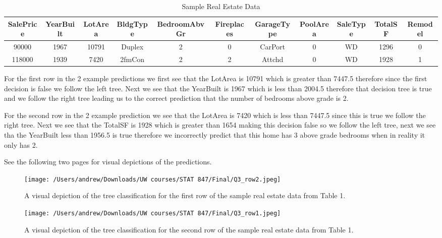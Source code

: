 \documentclass[
]{article}
\begin{document}
\begin{table}[!h]
\centering
\caption{Sample Real Estate Data}
\tiny
\begin{tabular}{|c|c|c|c|c|c|c|c|c|c|c|}
\hline
\textbf{SalePrice} & \textbf{YearBuilt} & \textbf{LotArea} & \textbf{BldgType} & \textbf{BedroomAbvGr} & \textbf{Fireplaces} & \textbf{GarageType} & \textbf{PoolArea} & \textbf{SaleType} & \textbf{TotalSF} & \textbf{Remodel} \\
\hline
90000 & 1967 & 10791 & Duplex & 2 & 0 & CarPort & 0 & WD & 1296 & 0 \\
\hline
118000 & 1939 & 7420 & 2fmCon & 2 & 2 & Attchd & 0 & WD & 1928 & 1 \\
\hline
\end{tabular}
\end{table}

For the first row in the 2 example predictions we first see that the
LotArea is 10791 which is greater than 7447.5 therefore since the first
decision is false we follow the left tree. Next we see that the
YearBuilt is 1967 which is less than 2004.5 therefore that decision tree
is true and we follow the right tree leading us to the correct
prediction that the number of bedrooms above grade is 2.

For the second row in the 2 example prediction we see that the LotArea
is 7420 which is less than 7447.5 since this is true we follow the right
tree. Next we see that the TotalSF is 1928 which is greater than 1654
making this decision false so we follow the left tree, next we see tha
the YearBuilt less than 1956.5 is true therefore we incorrectly predict
that this home has 3 above grade bedrooms when in reality it only has 2.

See the following two pages for visual depictions of the predictions.

\begin{figure}
\centering
\texttt{[image: /Users/andrew/Downloads/UW courses/STAT 847/Final/Q3\_row2.jpeg]}
\caption{A visual depiction of the tree classification for the first row
of the sample real estate data from Table 1.}
\end{figure}

\begin{figure}
\centering
\texttt{[image: /Users/andrew/Downloads/UW courses/STAT 847/Final/Q3\_row1.jpeg]}
\caption{A visual depiction of the tree classification for the second
row of the sample real estate data from Table 1.}
\end{figure}

\newpage
\end{document}
